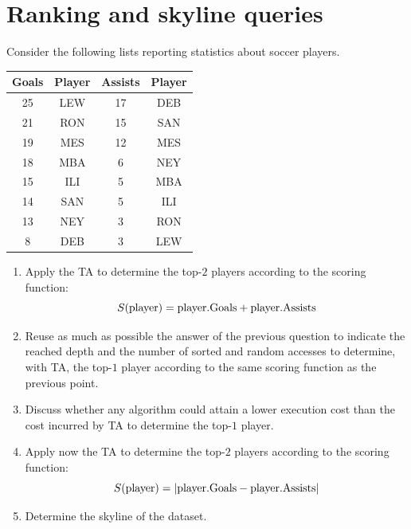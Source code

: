 \documentclass[12pt, a4paper]{report}
\begin{document}
    \section{Ranking and skyline queries}
        Consider the following lists reporting statistics about soccer players.
        \begin{table}[H]
            \centering
            \begin{tabular}{cc|cc}
            \hline
            \textbf{Goals} & \textbf{Player} & \textbf{Assists} & \textbf{Player} \\ \hline
            25             & LEW             & 17               & DEB             \\
            21             & RON             & 15               & SAN             \\
            19             & MES             & 12               & MES             \\
            18             & MBA             & 6                & NEY             \\
            15             & ILI             & 5                & MBA             \\
            14             & SAN             & 5                & ILI             \\
            13             & NEY             & 3                & RON             \\
            8              & DEB             & 3                & LEW             \\ \hline
            \end{tabular}
        \end{table}
        \begin{enumerate}
            \item Apply the TA to determine the top-$2$ players according to the scoring function: 
                \[S(\textnormal{player})=\textnormal{player.Goals}+\textnormal{player.Assists}\]
            \item Reuse as much as possible the answer of the previous question to indicate the 
                reached depth and the number of sorted and random accesses to determine, with TA,
                the top-$1$ player according to the same scoring function as the previous point.
            \item Discuss whether any algorithm could attain a lower execution cost than the cost 
                incurred by TA to determine the top-$1$ player. 
            \item Apply now the TA to determine the top-$2$ players according to the scoring function: 
                \[S(\textnormal{player})=\left\lvert \textnormal{player.Goals}-\textnormal{player.Assists} \right\rvert\]
            \item Determine the skyline of the dataset. 
        \end{enumerate}
\end{document}
